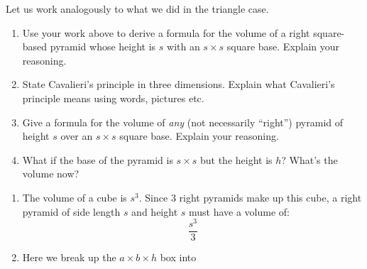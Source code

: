 \documentclass[nooutcomes,noauthor,handout,hints,12pt]{ximera}
\begin{document}
\begin{question}
  Let us work analogously to what we did in the triangle case.
  
  \begin{enumerate}
  \item Use your work above to derive a formula for the volume of a
    right square-based pyramid whose height is $s$ with an $s\times s$
    square base. Explain your reasoning.
  \item State Cavalieri's principle in three dimensions. Explain what Cavalieri's principle means using words, pictures etc.
  \item Give a formula for the volume of \emph{any} (not necessarily
    ``right'') pyramid of height $s$ over an $s\times s$ square
    base. Explain your reasoning.
  \item What if the base of the pyramid is $s\times s$ but the height is $h$? What's the volume now?
  \end{enumerate}
  \begin{freeResponse}
    \begin{enumerate}
    \item The volume of a cube is $s^3$. Since $3$ right pyramids make up
    this cube, a right pyramid of side length $s$ and height $s$ must
    have a volume of:
    \[
    \frac{s^3}{3}
    \]
    \item Here we break up the $a\times b\times h$ box into 
    \end{enumerate}
\end{freeResponse}
\end{question}
\mynewpage
\end{document}
